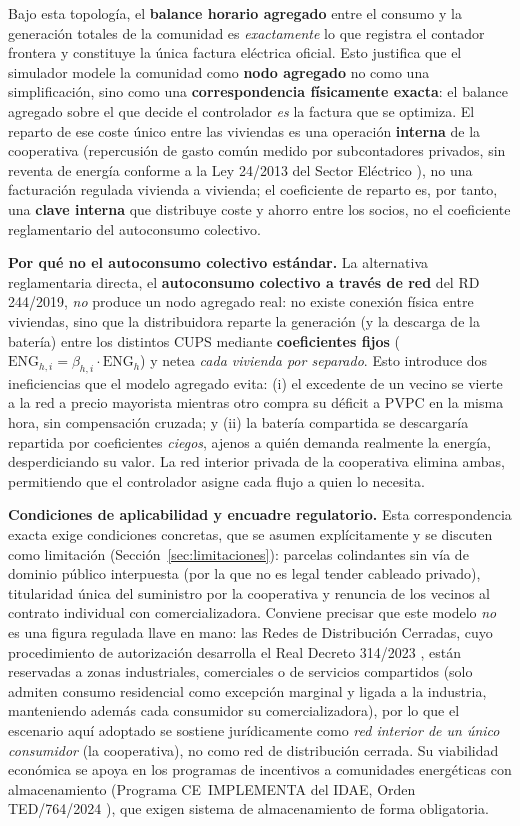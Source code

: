 \documentclass[12pt, a4paper, twoside]{report}
\begin{document}
Bajo esta topología, el \textbf{balance horario agregado} entre el consumo y la
generación totales de la comunidad es \emph{exactamente} lo que registra el
contador frontera y constituye la única factura eléctrica oficial. Esto justifica
que el simulador modele la comunidad como \textbf{nodo agregado} no como una
simplificación, sino como una \textbf{correspondencia físicamente exacta}: el
balance agregado sobre el que decide el controlador \emph{es} la factura que se
optimiza. El reparto de ese coste único entre las viviendas es una operación
\textbf{interna} de la cooperativa (repercusión de gasto común medido por
subcontadores privados, sin reventa de energía conforme a la Ley 24/2013 del
Sector Eléctrico \citep{Ley24_2013}), no una
facturación regulada vivienda a vivienda; el coeficiente de reparto es, por tanto,
una \textbf{clave interna} que distribuye coste y ahorro entre los socios, no el
coeficiente reglamentario del autoconsumo colectivo.

\textbf{Por qué no el autoconsumo colectivo estándar.} La alternativa
reglamentaria directa, el \textbf{autoconsumo colectivo a través de red} del
RD 244/2019, \emph{no} produce un nodo agregado real: no existe conexión física
entre viviendas, sino que la distribuidora reparte la generación (y la descarga
de la batería) entre los distintos CUPS mediante \textbf{coeficientes fijos}
($\text{ENG}_{h,i}=\beta_{h,i}\cdot\text{ENG}_h$) y netea \emph{cada vivienda por
separado}. Esto introduce dos ineficiencias que el modelo agregado evita:
(i) el excedente de un vecino se vierte a la red a precio mayorista mientras otro
compra su déficit a PVPC en la misma hora, sin compensación cruzada; y (ii) la
batería compartida se descargaría repartida por coeficientes \emph{ciegos},
ajenos a quién demanda realmente la energía, desperdiciando su valor. La red
interior privada de la cooperativa elimina ambas, permitiendo que el controlador
asigne cada flujo a quien lo necesita.

\textbf{Condiciones de aplicabilidad y encuadre regulatorio.} Esta
correspondencia exacta exige condiciones concretas, que se asumen explícitamente
y se discuten como limitación (Sección~\ref{sec:limitaciones}): parcelas
colindantes sin vía de dominio público interpuesta (por la que no es legal tender
cableado privado), titularidad única del suministro por la cooperativa y renuncia
de los vecinos al contrato individual con comercializadora. Conviene precisar que
este modelo \emph{no} es una figura regulada llave en mano: las Redes de
Distribución Cerradas, cuyo procedimiento de autorización desarrolla el Real
Decreto 314/2023 \citep{RD314_2023}, están reservadas a zonas industriales,
comerciales o de servicios compartidos (solo admiten consumo residencial como
excepción marginal y ligada a la industria, manteniendo además cada consumidor
su comercializadora), por lo que el escenario aquí adoptado se sostiene
jurídicamente como \emph{red interior de un único consumidor} (la cooperativa),
no como red de distribución cerrada. Su viabilidad económica se apoya en los
programas de incentivos a comunidades energéticas con almacenamiento (Programa
CE~IMPLEMENTA del IDAE, Orden TED/764/2024 \citep{TED764_2024}), que exigen
sistema de almacenamiento de forma obligatoria.
\end{document}
